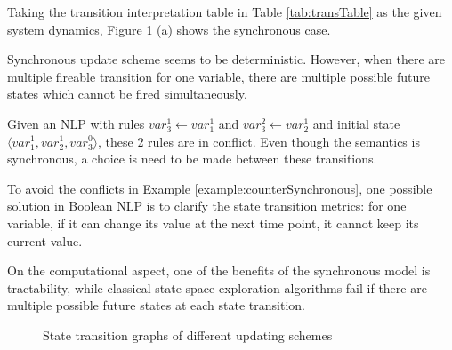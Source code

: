 \begin{example}
Taking the transition interpretation table in Table \ref{tab:transTable} as the given system dynamics, Figure \ref{fig:updateScheme} (a) shows the synchronous case. 
\end{example}


Synchronous update scheme seems to be deterministic. 
However, when there are multiple fireable transition for one variable, there are multiple possible future states which cannot be fired simultaneously. 

\begin{example}\label{example:counterSynchronous}
Given an NLP with rules $var_3^1\gets var_1^1$ and $var_3^2 \gets var_2^1$
and initial state $\langle var_1^1, var_2^1, var_3^0\rangle$,
these 2 rules are in conflict.
Even though the semantics is synchronous, a choice is need to be made between these transitions.
\end{example}

To avoid the conflicts in Example \ref{example:counterSynchronous}, one possible solution in Boolean NLP is to clarify the state transition metrics:
for one variable, if it can change its value at the next time point, it cannot keep its current value.

On the computational aspect, one of the benefits of the synchronous model is tractability, while classical state space exploration algorithms fail if there are multiple possible future states at each state transition.


\begin{figure}[ht]
\caption[Update schemes]{State transition graphs of different updating schemes}\label{fig:updateScheme}
\end{figure}
